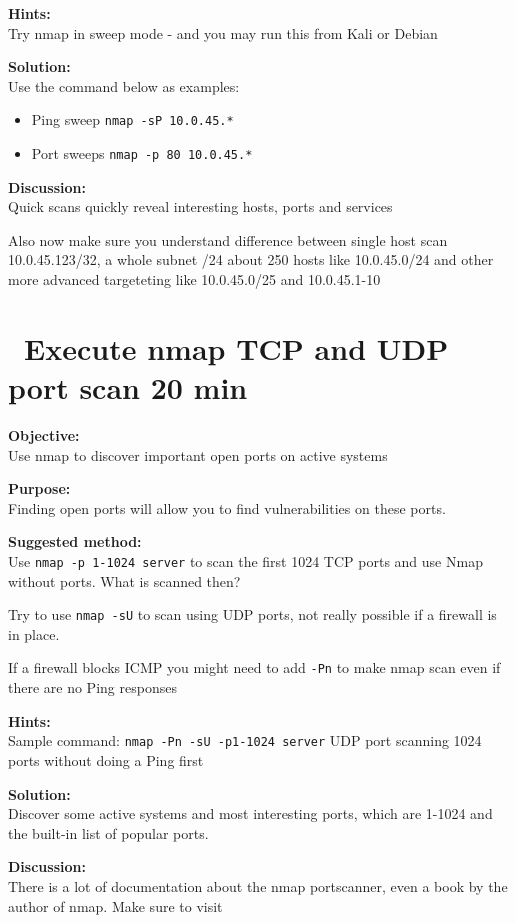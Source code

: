 \documentclass[a4paper,11pt,notitlepage]{report}
\begin{document}
{\bf Hints:} \\
Try nmap in sweep mode - and you may run this from Kali or Debian

{\bf Solution:}\\
Use the command below as examples:
\begin{itemize}
\item Ping sweep \verb+nmap -sP 10.0.45.*+
\item Port sweeps \verb+nmap -p 80 10.0.45.*+
\end{itemize}

{\bf Discussion:}\\
Quick scans quickly reveal interesting hosts, ports and services

Also now make sure you understand difference between single host scan
10.0.45.123/32, a whole subnet /24 about 250 hosts like 10.0.45.0/24 and other more advanced targeteting like 10.0.45.0/25 and 10.0.45.1-10


\chapter{\faInfoCircle\ Execute nmap TCP and UDP port scan 20 min}
\label{ex:nmap-synscan}


{\bf Objective:} \\
Use nmap to discover important open ports on active systems

{\bf Purpose:}\\
Finding open ports will allow you to find vulnerabilities on these ports.

{\bf Suggested method:}\\
Use \verb+nmap -p 1-1024 server+ to scan the first 1024 TCP
ports and use Nmap without ports. What is scanned then?

Try to use \verb+nmap -sU+ to scan using UDP ports, not really possible if a firewall is in place.

If a firewall blocks ICMP you might need to add \verb+-Pn+ to make nmap scan even if there are no Ping responses

{\bf Hints:} \\
Sample command: \verb+nmap -Pn -sU -p1-1024 server+ UDP port scanning
1024 ports without doing a Ping first

{\bf Solution:}\\
Discover some active systems and most interesting ports, which are 1-1024 and the built-in list of popular ports.

{\bf Discussion:}\\
There is a lot of documentation about the nmap portscanner, even a book by the author
of nmap. Make sure to visit 
\end{document}
